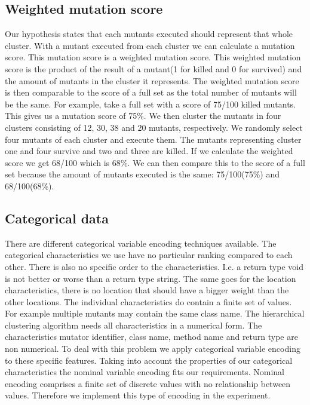 \documentclass[../../main]{subfiles}
\begin{document}
\subsection{Weighted mutation score}
\label{ch:weighted_score}
Our hypothesis states that each mutants executed should represent that whole cluster.
With a mutant executed from each cluster we can calculate a mutation score.
This mutation score is a weighted mutation score.
This weighted mutation score is the product of the result of a mutant(1 for killed and 0 for survived) and the amount of mutants in the cluster it represents.
The weighted mutation score is then comparable to the score of a full set as the total number of mutants will be the same.
\newline
For example, take a full set with a score of 75/100 killed mutants.
This gives us a mutation score of 75\%. 
We then cluster the mutants in four clusters consisting of 12, 30, 38 and 20 mutants, respectively.
We randomly select four mutants of each cluster and execute them.
The mutants representing cluster one and four survive and two and three are killed.
If we calculate the weighted score we get 68/100 which is 68\%.
We can then compare this to the score of a full set because the amount of mutants executed is the same: 75/100(75\%) and 68/100(68\%).

\subsection{Categorical data}
There are different categorical variable encoding techniques available\cite{Potdar2017AClassifiers}.
The categorical characteristics we use have no particular ranking compared to each other.
There is also no specific order to the characteristics.
I.e. a return type void is not better or worse than a return type string.
The same goes for the location characteristics, there is no location that should have a bigger weight than the other locations.
The individual characteristics do contain a finite set of values.
For example multiple mutants may contain the same class name.
The hierarchical clustering algorithm needs all characteristics in a numerical form\cite{Vijaya2019ComparativeClustering}.
The characteristics mutator identifier, class name, method name and return type are non numerical.
To deal with this problem we apply categorical variable encoding to these specific features.
Taking into account the properties of our categorical characteristics the nominal variable encoding fits our requirements.
Nominal encoding comprises a finite set of discrete values with no relationship between values\cite{Potdar2017AClassifiers}.
Therefore we implement this type of encoding in the experiment.
\end{document}
